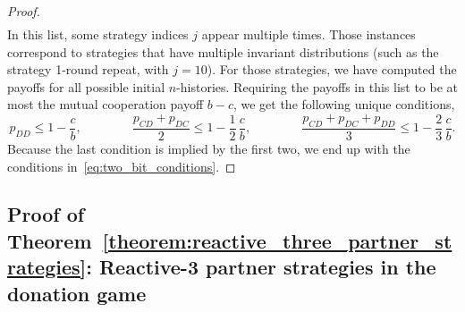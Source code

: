 \documentclass[9pt,twoside,lineno]{pnas-new}
\theoremstyle{plainCl1}
\theoremstyle{plainCl2}
\begin{document}
\begin{proof}
\begin{equation*}
\begin{array}{lcll}
  \end{array}
\end{equation*}
In this list, some strategy indices $j$ appear multiple times. 
Those instances correspond to strategies that have multiple invariant distributions (such as the strategy 1-round repeat, with $j\!=\!10$). For those strategies, we have computed the payoffs for all possible initial $n$-histories.  
Requiring the payoffs in this list to be at most the mutual cooperation payoff $b\! -\! c$, we get the following unique conditions,
\begin{equation*}
 p_{DD}  \le 1 \!-\! \frac{c}{b}, \qquad \qquad
\frac{p_{CD} + p_{DC}}{2}  \le 1\! -\! \frac{1}{2} \,  \frac{c}{b}, \qquad \qquad
 \frac{p_{CD} + p_{DC} + p_{DD}}{3} \le	 1 \!-\! \frac{2}{3} \, \frac{c}{b}.
\end{equation*}
Because the last condition is implied by the first two, we end up with the conditions in~\eqref{eq:two_bit_conditions}. 
\end{proof}




\subsection{Proof of Theorem~\ref{theorem:reactive_three_partner_strategies}: Reactive-3 partner strategies in the donation game}
\end{document}
